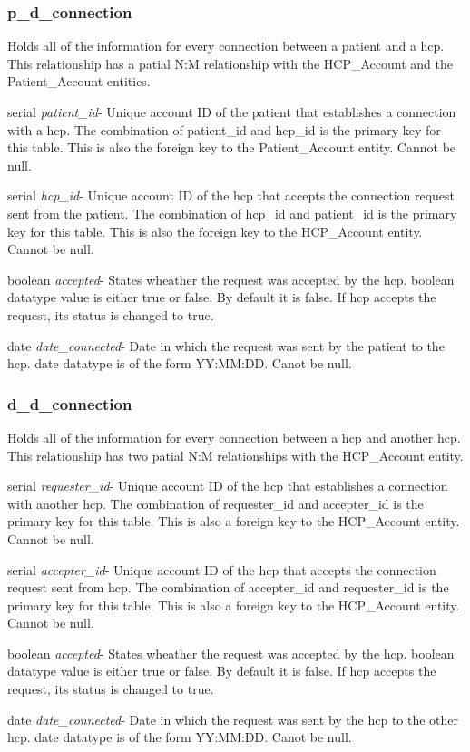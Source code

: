 \documentclass[12pt]{report}
\begin{document}
\subsubsection{p\_d\_connection}
Holds all of the information for every connection between a patient and a hcp.  This relationship has a patial N:M relationship with the HCP\_Account and the Patient\_Account entities.

\begin{description}
\item serial \textit{patient\_id}- Unique account ID of the patient that establishes a connection with a hcp.  The combination of patient\_id and hcp\_id is the primary key for this table.  This is also the foreign key to the Patient\_Account entity.  Cannot be null.
\item serial \textit{hcp\_id}- Unique account ID of the hcp that accepts the connection request sent from the patient.  The combination of hcp\_id and patient\_id is the primary key for this table.  This is also the foreign key to the HCP\_Account entity.  Cannot be null.
\item boolean \textit{accepted}- States wheather the request was accepted by the hcp.  boolean datatype value is either true or false.  By default it is false.  If hcp accepts the request, its status is changed to true.
\item date \textit{date\_connected}- Date in which the request was sent by the patient to the hcp.  date datatype is of the form YY:MM:DD.  Canot be null.
\end{description}

\subsubsection{d\_d\_connection}
Holds all of the information for every connection between a hcp and another hcp.  This relationship has two patial N:M relationships with the HCP\_Account entity.

\begin{description}
\item serial \textit{requester\_id}- Unique account ID of the hcp that establishes a connection with another hcp.  The combination of requester\_id and accepter\_id is the primary key for this table.  This is also a foreign key to the HCP\_Account entity.  Cannot be null.  
\item serial \textit{accepter\_id}- Unique account ID of the hcp that accepts the connection request sent from hcp.  The combination of accepter\_id and requester\_id is the primary key for this table.  This is also a foreign key to the HCP\_Account entity.  Cannot be null.
\item boolean \textit{accepted}- States wheather the request was accepted by the hcp.  boolean datatype value is either true or false.  By default it is false.  If hcp accepts the request, its status is changed to true.
\item date \textit{date\_connected}- Date in which the request was sent by the hcp to the other hcp.  date datatype is of the form YY:MM:DD.  Canot be null.
\end{description}
\end{document}
